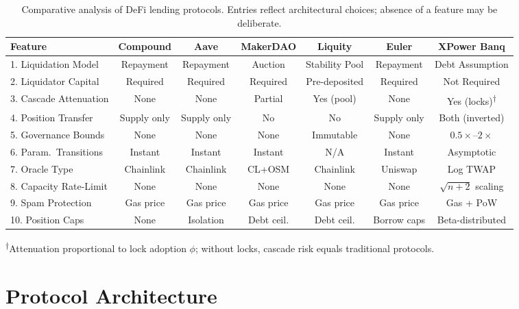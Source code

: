 \documentclass[10pt,a4paper,twocolumn]{article}
\begin{document}
\begin{table}[htbp]
\centering
\caption{Comparative analysis of DeFi lending protocols. Entries reflect architectural choices; absence of a feature may be deliberate.}
\label{tab:protocol-comparison}
\small
\begin{tabular}{@{}lcccccc@{}}
\toprule
Feature & Compound & Aave & MakerDAO & Liquity & Euler & \textbf{XPower Banq} \\
\midrule
1. Liquidation Model & Repayment & Repayment & Auction & Stability Pool & Repayment & Debt Assumption \\
2. Liquidator Capital & Required & Required & Required & Pre-deposited & Required & Not Required \\
3. Cascade Attenuation & None & None & Partial & Yes (pool) & None & Yes (locks)\textsuperscript{$\dagger$} \\
4. Position Transfer & Supply only & Supply only & No & No & Supply only & Both (inverted) \\
5. Governance Bounds & None & None & None & Immutable & None & $0.5\times$--$2\times$ \\
6. Param.\ Transitions & Instant & Instant & Instant & N/A & Instant & Asymptotic \\
7. Oracle Type & Chainlink & Chainlink & CL+OSM & Chainlink & Uniswap & Log TWAP \\
8. Capacity Rate-Limit & None & None & None & None & None & $\sqrt{n{+}2}$ scaling \\
9. Spam Protection & Gas price & Gas price & Gas price & Gas price & Gas price & Gas + PoW \\
10. Position Caps & None & Isolation & Debt ceil. & Debt ceil. & Borrow caps & Beta-distributed \\
\bottomrule
\end{tabular}
\vspace{0.3em}
\par\raggedright\scriptsize\textsuperscript{$\dagger$}Attenuation proportional to lock adoption $\phi$; without locks, cascade risk equals traditional protocols.
\end{table}

\section{Protocol Architecture}
\label{sec:architecture}
\end{document}
